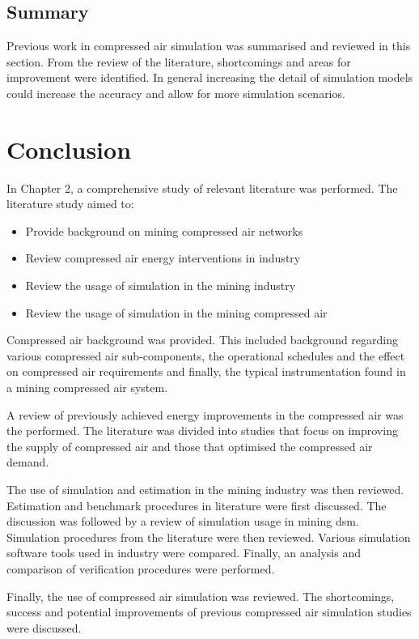 	\subsection{Summary}\label{Shortcomings of previous work}
	Previous work in compressed air simulation was summarised and reviewed in this section. From the review of the literature, shortcomings and areas for improvement were identified. In general increasing the detail of simulation models could increase the accuracy and allow for more simulation scenarios.
\section{Conclusion}
In Chapter 2, a comprehensive study of relevant literature was performed. The literature study aimed to:
\begin{itemize}
	\item Provide background on mining compressed air networks
	\item Review compressed air energy interventions in industry
	\item Review the usage of simulation in the mining industry 
	\item Review the usage of simulation in the mining compressed air
\end{itemize}
Compressed air background was provided. This included background regarding various compressed air sub-components, the operational schedules and the effect on compressed air requirements and finally, the typical instrumentation found in a mining compressed air system.
\par
A review of previously achieved energy improvements in the compressed air was the performed. The literature was divided into studies that focus on improving the supply of compressed air and those that optimised the compressed air demand.
\par
The use of simulation and estimation in the mining industry was then reviewed. Estimation and benchmark procedures in literature were first discussed. The discussion was followed by a review of simulation usage in mining \gls{dsm}. Simulation procedures from the literature were then reviewed. Various simulation software tools used in industry were compared. Finally, an analysis and comparison of verification procedures were performed.
\par 
	Finally, the use of compressed air simulation was reviewed.  The shortcomings, success and potential improvements of previous compressed air simulation studies were discussed.